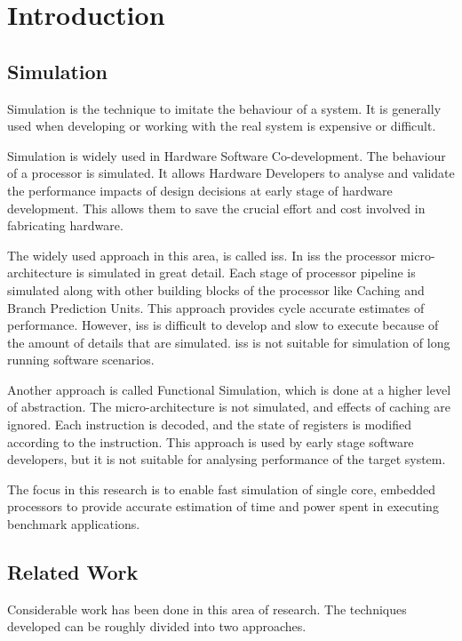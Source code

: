 \chapter{Introduction}\label{chapter:introduction}

\section{Simulation}

Simulation is the technique to imitate the behaviour of a system. It is generally used when developing or working with the real system is expensive or difficult. 

Simulation is widely used in Hardware Software Co-development. The behaviour of a processor is simulated. It allows Hardware Developers to analyse and validate the performance impacts of design decisions at early stage of hardware development. This allows them to save the crucial effort and cost involved in fabricating hardware.

The widely used approach in this area, is called \gls{iss}. In \gls{iss} the processor micro-architecture is simulated in great detail. Each stage of processor pipeline is simulated along with other building blocks of the processor like Caching and Branch Prediction Units. This approach provides cycle accurate estimates of performance. However, \gls{iss} is difficult to develop and slow to execute because of the amount of details that are simulated. \gls{iss} is not suitable for simulation of long running software scenarios.

Another approach is called Functional Simulation, which is done at a higher level of abstraction. The micro-architecture is not simulated, and effects of caching are ignored. Each instruction is decoded, and the state of registers is modified according to the instruction. This approach is used by early stage software developers, but it is not suitable for analysing performance of the target system.

The focus in this research is to enable fast simulation of single core, embedded processors to provide accurate estimation of time and power spent in executing benchmark applications.

\section{Related Work}
Considerable work has been done in this area of research. The techniques developed can be roughly divided into two approaches. 

